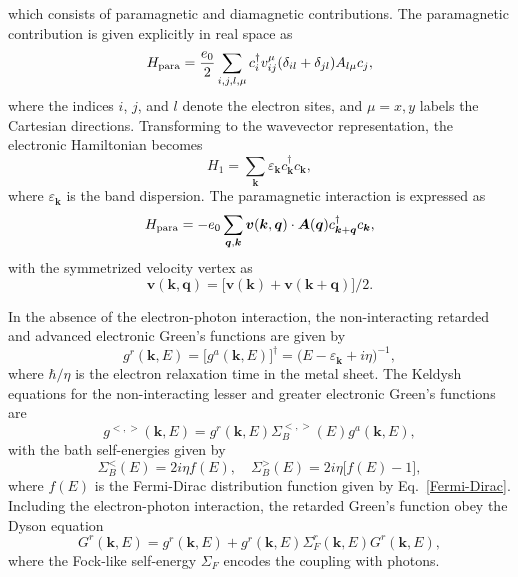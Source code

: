 \documentclass[aps,prl,twocolumn,longbibliography]{revtex4-2}
\begin{document}
which consists of paramagnetic and diamagnetic contributions.
The paramagnetic contribution is given explicitly in real space as~\cite{JSW23}
\begin{equation}
  H_{\rm para} = \frac{e_0}{2} \sum_{i,j, l,\mu} c_i^\dag v_{ij}^\mu (\delta_{il} +
  \delta_{jl}) A_{l \mu} c_j ,
\end{equation}
where the indices $i$, $j$, and $l$ denote the electron sites, and $\mu =x,y$ labels the
Cartesian directions. Transforming to the wavevector representation, the electronic
Hamiltonian becomes
\begin{equation}
  H_1 = \sum_{\bm{k}} \varepsilon_{\bm{k}} c_{\bm{k}}^{\dag}c_{\bm{k}} ,
\end{equation}
where $\varepsilon_{\bm{k}}$ is the band dispersion. The paramagnetic interaction is expressed
as
\begin{equation}
  H_{\rm para} = -e_0 \sum_{\bm{q}, \bm{k}} \bm{v}(\bm{k},\bm{q}) \cdot \bm{A}(\bm{q})
  c_{\bm{k}+\bm{q}}^{\dag}c_{\bm{k}} ,
\end{equation}
with the symmetrized velocity vertex as
\begin{equation}
  \bm{v}(\bm{k},\bm{q}) = \big[ \bm{v}(\bm{k}) + \bm{v}(\bm{k} + \bm{q}) \big] / 2 .
\end{equation}

In the absence of the electron-photon interaction, the non-interacting retarded and
advanced electronic Green's functions are given by
\begin{equation}
  g^r(\bm{k},E) = \big[ g^a(\bm{k},E)\big]^\dag
  = \big( E - \varepsilon_{\bm{k}} + i\eta \big)^{-1} ,
\end{equation}
where $\hbar/\eta$ is the electron relaxation time in the metal sheet.
The Keldysh equations for the non-interacting lesser and greater electronic Green's
functions are
\begin{equation} \label{g<>}
  g^{<,>}(\bm{k},E) = g^r(\bm{k},E) \Sigma_B^{<,>}(E) g^a(\bm{k},E) ,
\end{equation}
with the bath self-energies given by
\begin{equation}
  \Sigma_B^<(E) = 2i\eta f(E), \quad \Sigma_B^>(E) = 2i\eta \big[f(E) -1 \big] ,
\end{equation}
where $f(E)$ is the Fermi-Dirac distribution function given by Eq.~\eqref{Fermi-Dirac}.
Including the electron-photon interaction, the retarded Green's function obey the Dyson
equation
\begin{equation}
  G^r(\bm{k},E) = g^r(\bm{k},E) + g^r(\bm{k},E) \Sigma^r_F(\bm{k},E) G^r(\bm{k},E) ,
\end{equation}
where the Fock-like self-energy $\Sigma_F$ encodes the coupling with photons.
\end{document}
